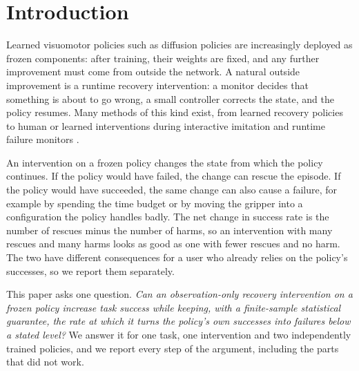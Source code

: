 \section{Introduction}\label{sec:intro}

Learned visuomotor policies such as diffusion policies \cite{chi2023diffusion} are increasingly deployed as frozen components: after training, their weights are fixed, and any further improvement must come from outside the network. A natural outside improvement is a runtime recovery intervention: a monitor decides that something is about to go wrong, a small controller corrects the state, and the policy resumes. Many methods of this kind exist, from learned recovery policies \cite{reichlin2022manifold,cideron2023getback,vats2025recoverychaining} to human or learned interventions during interactive imitation \cite{ross2011dagger,kelly2019hgdagger,hoque2022thrifty} and runtime failure monitors \cite{agia2025unpacking,romer2025fiper,liu2023reflect,duan2025aha}.

An intervention on a frozen policy changes the state from which the policy continues. If the policy would have failed, the change can rescue the episode. If the policy would have succeeded, the same change can also cause a failure, for example by spending the time budget or by moving the gripper into a configuration the policy handles badly. The net change in success rate is the number of rescues minus the number of harms, so an intervention with many rescues and many harms looks as good as one with fewer rescues and no harm. The two have different consequences for a user who already relies on the policy's successes, so we report them separately.

This paper asks one question. \emph{Can an observation-only recovery intervention on a frozen policy increase task success while keeping, with a finite-sample statistical guarantee, the rate at which it turns the policy's own successes into failures below a stated level?} We answer it for one task, one intervention and two independently trained policies, and we report every step of the argument, including the parts that did not work.

